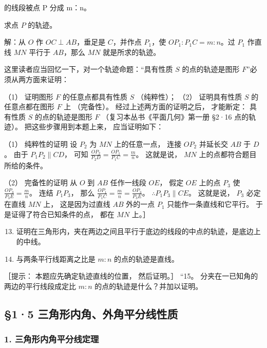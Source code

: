 的线段被点 P 分成 m：n。

求点 \(P\) 的轨迹。

解：从 \(O\) 作 \(OC \perp AB\)，垂足是 \(C\)，并作点 \(P_{1}\)，使
\(OP_{1}:P_{1}C = m:n\)。过 \(P_{1}\) 作直线 \(MN\) 平行于 \(AB\)，那么
\(MN\) 就是所求的轨迹。

这里读者应当回忆一下，对一个轨迹命题：``具有性质 \(S\) 的点的轨迹是图形
\(F\)''必须从两方面来证明：

（1） 证明图形 \(F\) 的任意点都具有性质 \(S\) （纯粹性）； （2）
证明具有性质 \(S\) 的任意点都在图形 \(F\) 上 （完备性）。
经过上述两方面的证明之后， 才能断定： 具有性质 \(S\) 的点的轨迹是图形
\(F\) （复习本丛书《平面几何》第一册 §2·16 点的轨迹）。
把这些步骤用到本题上来， 应当证明如下：

（1） 纯粹性的证明 设 \(P_{2}\) 为 \(MN\) 上的任意一点， 连接 \(OP_{2}\)
并延长交 \(AB\) 于 \(D\)。 由于 \(P_{1}P_{2} \parallel CD\)， 可知
\(\frac{OP_{2}}{P_{2}D} = \frac{OP_{1}}{P_{1}C} = \frac{m}{n}\)。
这就是说， \(MN\) 上的点都符合题目所给的条件。

（2） 完备性的证明 从 \(O\) 到 \(AB\) 任作一线段 \(OE\)， 假定 \(OE\)
上的点 \(P_{3}\) 使 \(\frac{OP_{3}}{P_{3}E} = \frac{m}{n}\)。 连结
\(P_{1}P_{3}\)， 那么
\(\frac{OP_{1}}{P_{1}C} = \frac{m}{n} = \frac{OP_{3}}{P_{3}E}\)。
\(\therefore P_{1}P_{3} \parallel CE\)。 这就是说， \(P_{3}\) 必定在直线
\(MN\) 上， 这是因为过直线 \(AB\) 外的一点 \(P_{1}\)
只能作一条直线和它平行。 于是证得了符合已知条件的点， 都在 \(MN\) 上。］

\begin{enumerate}
\setcounter{enumi}{12}
\item
  证明在三角形内，夹在两边之间且平行于底边的线段的中点的轨迹，是底边上的中线。
\item
  与两条平行线距离之比是 \(m:n\) 的点的轨迹是直线。
\end{enumerate}

［提示： 本题应先确定轨迹直线的位置， 然后证明。］ ``15。
分夹在一已知角的两边的平行线段成定比 \(m:n\)
的点的轨迹是什么？并加以证明。

\subsection{§1·5
三角形内角、外角平分线性质}

\subsubsection{1.
三角形内角平分线定理}

